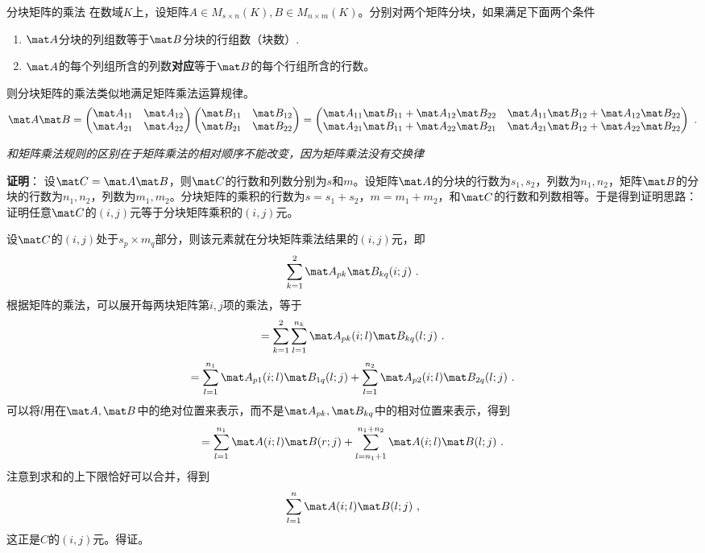 
\begin{theorem}{分块矩阵的乘法}
在数域$K$上，设矩阵$A\in{M_{s\times{n}}(K)},B\in{M_{n\times{m}}(K)}$。分别对两个矩阵分块，如果满足下面两个条件
\begin{enumerate}
\item $\mat A$分块的列组数等于$\mat B$分块的行组数（块数）.
\item $\mat A$的每个列组所含的列数\textbf{对应}等于$\mat B$的每个行组所含的行数。
\end{enumerate}
则分块矩阵的乘法类似地满足矩阵乘法运算规律。
\begin{equation}
\mat A\mat B=
\begin{pmatrix}
\mat A_{11} & \mat A_{12}\\
\mat A_{21} & \mat A_{22}
\end{pmatrix}
\begin{pmatrix}
\mat B_{11} & \mat B_{12}\\
\mat B_{21} & \mat B_{22}
\end{pmatrix}
=
\begin{pmatrix}
\mat A_{11}\mat B_{11}+\mat A_{12}\mat B_{22} & \mat A_{11}\mat B_{12}+\mat A_{12}\mat B_{22}\\
\mat A_{21}\mat B_{11}+\mat A_{22}\mat B_{21} & \mat A_{21}\mat B_{12}+\mat A_{22}\mat B_{22}
\end{pmatrix}~.
\end{equation}
\end{theorem}
\textsl{和矩阵乘法规则的区别在于矩阵乘法的相对顺序不能改变，因为矩阵乘法没有交换律}

\textbf{证明}：
设$\mat C=\mat A\mat B$，则$\mat C$的行数和列数分别为$s$和$m$。设矩阵$\mat A$的分块的行数为$s_1,s_2$，列数为$n_1,n_2$，矩阵$\mat B$的分块的行数为$n_1,n_2$，列数为$m_1,m_2$。分块矩阵的乘积的行数为$s=s_1+s_2$，$m=m_1+m_2$，和$\mat C$的行数和列数相等。于是得到证明思路：证明任意$\mat C$的$(i,j)$元等于分块矩阵乘积的$(i,j)$元。

设$\mat C$的$(i,j)$处于$s_p\times{m_q}$部分，则该元素就在分块矩阵乘法结果的$(i,j)$元，即
\[\sum_{k=1}^{2}\mat A_{pk}\mat B_{kq}(i;j)~.\]
根据矩阵的乘法，可以展开每两块矩阵第$i,j$项的乘法，等于
\[=\sum_{k=1}^{2}\sum_{l=1}^{n_k}\mat A_{pk}(i;l)\mat B_{kq}(l;j)~.\]
\[=\sum_{l=1}^{n_1}\mat A_{p1}(i;l)\mat B_{1q}(l;j)+\sum_{l=1}^{n_2}\mat A_{p2}(i;l)\mat B_{2q}(l;j)~.\]
可以将$l$用在$\mat A,\mat B$中的绝对位置来表示，而不是$\mat A_{pk},\mat B_{kq}$中的相对位置来表示，得到
\[=\sum_{l=1}^{n_1}\mat A(i;l)\mat B(r;j)+\sum_{l=n_1+1}^{n_1+n_2}\mat A(i;l)\mat B(l;j)~.\]
注意到求和的上下限恰好可以合并，得到
\[\sum_{l=1}^{n}\mat A(i;l)\mat B(l;j)~,\]
这正是$C$的$(i,j)$元。得证。

